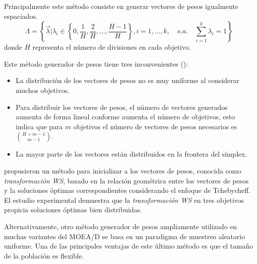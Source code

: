 Principalmente este método consiste en generar vectores de pesos igualmente espaciados.
\begin{equation}
\Lambda = \left  \{  \vec{\lambda} | \lambda_i \in \left \{ 0, \frac{1}{H}, \frac{2}{H},...,\frac{H-1}{H} \right \}, i=1, ..., k, \quad s. a. \quad \sum_{i=1}^{k} \lambda_i = 1 \right \}
\end{equation}
donde $H$ representa el número de divisiones en cada objetivo.


%
Este método generador de pesos tiene tres inconvenientes (\cite{finkenstadt2006statistical, berengueroptimizacion}):
\begin{itemize}
   \item La distribución de los vectores de pesos no es  muy uniforme al considerar muchos objetivos.
   \item Para distribuir los vectores de pesos, el número de vectores generados aumenta de forma lineal conforme aumenta el número de objetivos, esto indica que para $m$ objetivos el número de vectores de pesos necesarios es $\binom{H+m-1}{m-1}$.
   \item La mayor parte de los vectores están distribuidos en la frontera del símplex.
\end{itemize}


\cite{Joel:MOEAD_AWA} propusieron un método para inicializar a los vectores de pesos, conocida como \textit{transformación WS}, basado en la relación geométrica entre los vectores de pesos y la soluciones óptimas correspondientes considerando el enfoque de Tchebycheff.
%
El estudio experimental demuestra que la \textit{transformación WS} en tres objetivos propicia soluciones óptimas bien distribuidas.


Alternativamente, otro método generador de pesos ampliamente utilizado en muchas variantes del MOEA/D se basa en un paradigma de muestreo aleatorio uniforme.
%
Una de las principales ventajas de este último método es que el tamaño de la población es flexible.
%



